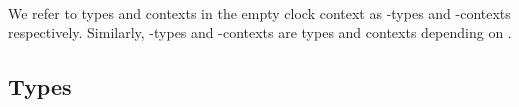 \begin{code}%
\>[0]\AgdaSpace{}%
\AgdaSpace{}%
\AgdaSymbol{:}\AgdaSpace{}%
\AgdaSpace{}%
\<%
\\
\>[0][@{}l@{\AgdaIndent{0}}]%
\>[2]\AgdaSpace{}%
\AgdaSpace{}%
\AgdaSymbol{:}\AgdaSpace{}%
\<%
\end{code}
We refer to types and contexts in the empty clock context as -types and
-contexts respectively. Similarly,  -types and
-contexts are types and contexts depending on .

\subsection{Types}

